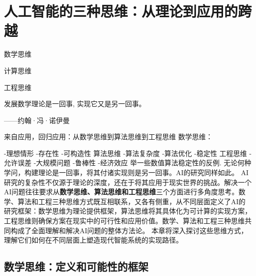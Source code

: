 \chapter{人工智能的三种思维：从理论到应用的跨越}
\begin{introduction}[本章提要]
  \item 数学思维
  \item 计算思维
  \item 工程思维
\end{introduction}
发展数学理论是一回事, 实现它又是另一回事。


\begin{flushright}
 ------约翰·冯·诺伊曼
\end{flushright}
来自应用，回归应用：从数学思维到算法思维到工程思维
数学思维：

-理想情形
-存在性
-可构造性
算法思维
-算法复杂度
-算法优化
-稳定性
工程思维
-允许误差
-大规模问题
-鲁棒性
-经济效应
举一些数值算法稳定性的反例.
无论何种学问，构建理论是一回事，将其付诸实现则是另一回事。AI的研究同样如此。
AI 研究的复杂性不仅源于理论的深度，还在于将其应用于现实世界的挑战。解决一个AI问题往往要求从{\bf 数学思维、算法思维和工程思维}三个方面进行多角度思考。数学、算法和工程三种思维方式既互相联系，又各有侧重，从不同层面定义了AI的研究框架：数学思维为理论提供框架，算法思维将其具体化为可计算的实现方案，工程思维则确保方案在现实中的可行性和应用价值。数学、算法和工程三种思维共同构成了全面理解和解决AI问题的整体方法论。
本章将深入探讨这些思维方式，理解它们如何在不同层面上塑造现代智能系统的实现路径。
\section{数学思维：定义和可能性的框架}


